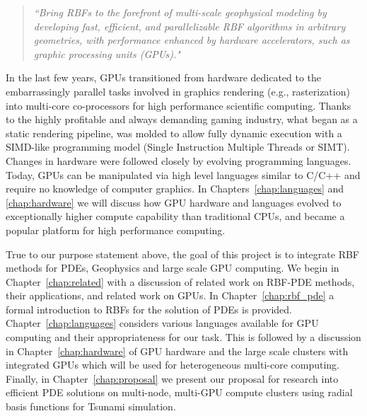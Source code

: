 \begin{quote}
\emph{``Bring RBFs to the forefront of multi-scale geophysical modeling by developing fast, efficient, and parallelizable RBF algorithms in arbitrary geometries, with performance enhanced by hardware accelerators, such as graphic processing units (GPUs)."} \cite{RBF_proposal:2009}
\end{quote}

In the last few years, GPUs transitioned from hardware dedicated to the embarrassingly parallel tasks involved in graphics rendering (e.g., 
rasterization) into multi-core co-processors for high performance scientific computing.  Thanks to the highly profitable and always demanding gaming industry, what began as a static rendering pipeline, was molded to allow fully dynamic execution with a SIMD-like programming model (Single Instruction Multiple Threads or SIMT). Changes in hardware were 
followed closely by evolving programming languages. Today, GPUs can be manipulated via high level 
languages 
similar to C/C++ and require no knowledge of computer graphics. 
In Chapters~\ref{chap:languages} and \ref{chap:hardware} we will discuss 
how GPU hardware and languages evolved to exceptionally higher compute capability than traditional CPUs, and became a popular platform for high performance computing.

True to our purpose statement above, the goal of this project is to integrate RBF methods for PDEs, Geophysics and large scale GPU computing. We begin in Chapter~\ref{chap:related} with a discussion of related work on RBF-PDE methods, their applications, and related work 
on GPUs. In Chapter~\ref{chap:rbf_pde} a formal introduction to RBFs for the solution of PDEs is provided. Chapter~\ref{chap:languages} considers various languages available for GPU computing and 
their appropriateness for our task. This is followed by a 
discussion in Chapter~\ref{chap:hardware} of GPU hardware and the large scale clusters with integrated GPUs which will be used for heterogeneous multi-core computing. Finally, in Chapter~\ref{chap:proposal} we present our proposal for research into efficient PDE 
solutions on multi-node, multi-GPU compute clusters using radial basis functions for Tsunami simulation.



